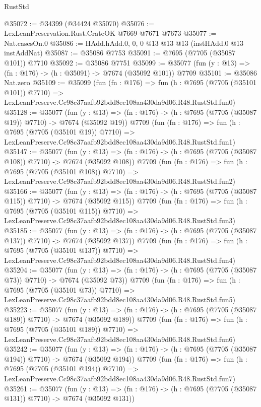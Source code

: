\begin{lexlean}{RustStd}
\begin{coremodule}
@35072 := @34399 (@34424 @35070)
@35076 := LexLeanPreservation.Rust.CrateOK @7669 @7671 @7673
@35077 := Nat.casesOn.{0}
@35086 := HAdd.hAdd.{0, 0, 0} @13 @13 @13 (instHAdd.{0} @13 instAddNat)
@35087 := @35086 @7753
@35091 := @7695 (@7705 (@35087 @101)) @7710
@35092 := @35086 @7751
@35099 := @35077 (fun (y : @13) => (fn : @176) -> (h : @35091) -> @7674 (@35092 @101)) @7709
@35101 := @35086 Nat.zero
@35109 := @35099
    (fun (fn : @176) =>
    fun (h : @7695 (@7705 (@35101 @101)) @7710) =>
    LexLeanPreserve.Cc98c37aafb92bdd8ec108aa430da9d06.R48.RustStd.fun0)
@35128 := @35077
    (fun (y : @13) => (fn : @176) -> (h : @7695 (@7705 (@35087 @19)) @7710) -> @7674 (@35092 @19))
    @7709
    (fun (fn : @176) =>
    fun (h : @7695 (@7705 (@35101 @19)) @7710) =>
    LexLeanPreserve.Cc98c37aafb92bdd8ec108aa430da9d06.R48.RustStd.fun1)
@35147 := @35077
    (fun (y : @13) => (fn : @176) -> (h : @7695 (@7705 (@35087 @108)) @7710) -> @7674 (@35092 @108))
    @7709
    (fun (fn : @176) =>
    fun (h : @7695 (@7705 (@35101 @108)) @7710) =>
    LexLeanPreserve.Cc98c37aafb92bdd8ec108aa430da9d06.R48.RustStd.fun2)
@35166 := @35077
    (fun (y : @13) => (fn : @176) -> (h : @7695 (@7705 (@35087 @115)) @7710) -> @7674 (@35092 @115))
    @7709
    (fun (fn : @176) =>
    fun (h : @7695 (@7705 (@35101 @115)) @7710) =>
    LexLeanPreserve.Cc98c37aafb92bdd8ec108aa430da9d06.R48.RustStd.fun3)
@35185 := @35077
    (fun (y : @13) => (fn : @176) -> (h : @7695 (@7705 (@35087 @137)) @7710) -> @7674 (@35092 @137))
    @7709
    (fun (fn : @176) =>
    fun (h : @7695 (@7705 (@35101 @137)) @7710) =>
    LexLeanPreserve.Cc98c37aafb92bdd8ec108aa430da9d06.R48.RustStd.fun4)
@35204 := @35077
    (fun (y : @13) => (fn : @176) -> (h : @7695 (@7705 (@35087 @73)) @7710) -> @7674 (@35092 @73))
    @7709
    (fun (fn : @176) =>
    fun (h : @7695 (@7705 (@35101 @73)) @7710) =>
    LexLeanPreserve.Cc98c37aafb92bdd8ec108aa430da9d06.R48.RustStd.fun5)
@35223 := @35077
    (fun (y : @13) => (fn : @176) -> (h : @7695 (@7705 (@35087 @189)) @7710) -> @7674 (@35092 @189))
    @7709
    (fun (fn : @176) =>
    fun (h : @7695 (@7705 (@35101 @189)) @7710) =>
    LexLeanPreserve.Cc98c37aafb92bdd8ec108aa430da9d06.R48.RustStd.fun6)
@35242 := @35077
    (fun (y : @13) => (fn : @176) -> (h : @7695 (@7705 (@35087 @194)) @7710) -> @7674 (@35092 @194))
    @7709
    (fun (fn : @176) =>
    fun (h : @7695 (@7705 (@35101 @194)) @7710) =>
    LexLeanPreserve.Cc98c37aafb92bdd8ec108aa430da9d06.R48.RustStd.fun7)
@35261 := @35077
    (fun (y : @13) => (fn : @176) -> (h : @7695 (@7705 (@35087 @131)) @7710) -> @7674 (@35092 @131))

\end{coremodule}
\end{lexlean}
